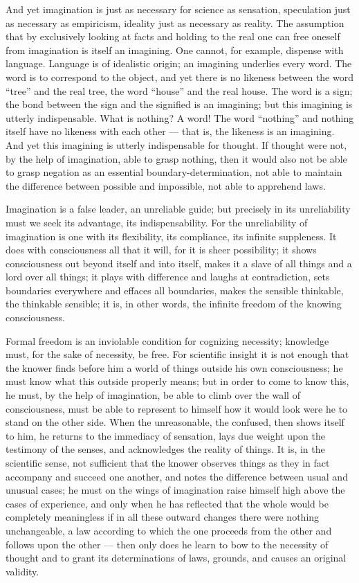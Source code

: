 \documentclass[12pt]{book}
\begin{document}
And yet imagination is just as necessary for science as sensation, speculation
just as necessary as empiricism, ideality just as necessary as reality. The
assumption that by exclusively looking at facts and holding to the real one
can free oneself from imagination is itself an imagining. One cannot, for
example, dispense with language. Language is of idealistic origin; an imagining
underlies every word. The word is to correspond to the object, and yet there
is no likeness between the word ``tree'' and the real tree, the word ``house''
and the real house. The word is a sign; the bond between the sign and the
signified is an imagining; but this imagining is utterly indispensable. What is
nothing? A word! The word ``nothing'' and nothing itself have no likeness with
each other --- that is, the likeness is an imagining. And yet this imagining is
utterly indispensable for thought. If thought were not, by the help of
imagination, able to grasp nothing, then it would also not be able to grasp
negation as an essential boundary-determination, not able to maintain the
difference between possible and impossible, not able to apprehend laws.

Imagination is a false leader, an unreliable guide; but precisely in its
unreliability must we seek its advantage, its indispensability. For the
unreliability of imagination is one with its flexibility, its compliance, its
infinite suppleness. It does with consciousness all that it will, for it is
sheer possibility; it shows consciousness out beyond itself and into itself,
makes it a slave of all things and a lord over all things; it plays with
difference and laughs at contradiction, sets boundaries everywhere and effaces
all boundaries, makes the sensible thinkable, the thinkable sensible; it is,
in other words, the infinite freedom of the knowing consciousness.

Formal freedom is an inviolable condition for cognizing necessity; knowledge
must, for the sake of necessity, be free. For scientific insight it is not
enough that the knower finds before him a world of things outside his own
consciousness; he must know what this outside properly means; but in order to
come to know this, he must, by the help of imagination, be able to climb over
the wall of consciousness, must be able to represent to himself how it would
look were he to stand on the other side. When the unreasonable, the confused,
then shows itself to him, he returns to the immediacy of sensation, lays due
weight upon the testimony of the senses, and acknowledges the reality of
things. It is, in the scientific sense, not sufficient that the knower
observes things as they in fact accompany and succeed one another, and notes
the difference between usual and unusual cases; he must on the wings of
imagination raise himself high above the cases of experience, and only when he
has reflected that the whole would be completely meaningless if in all these
outward changes there were nothing unchangeable, a law according to which the
one proceeds from the other and follows upon the other --- then only does he
learn to bow to the necessity of thought and to grant its determinations of
laws, grounds, and causes an original validity.
\end{document}
